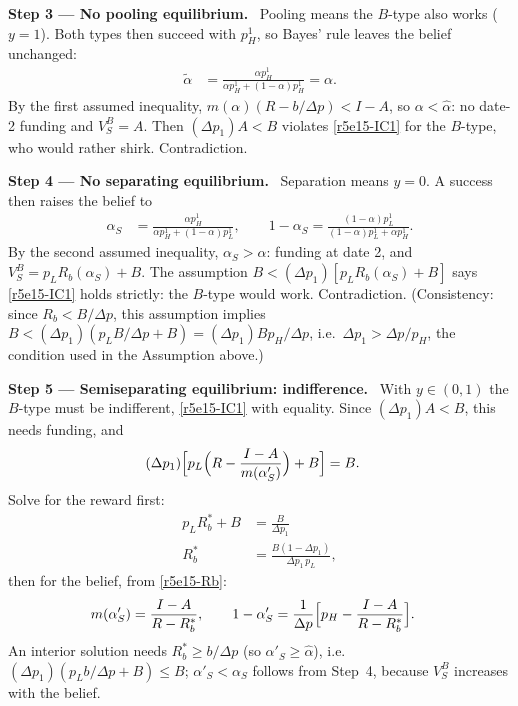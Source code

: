\documentclass[11pt,a4paper]{article}
\newcommand{\step}[2]{\par\medskip\noindent\textbf{Step #1 --- #2.}~}
\begin{document}
\step{3}{No pooling equilibrium} Pooling means the $B$-type also works ($y=1$). Both types then succeed with $p^1_H$, so Bayes' rule leaves the belief unchanged:
\begin{align}
  \tilde\alpha &= \frac{\alpha p^1_H}{\alpha p^1_H+(1-\alpha)p^1_H} = \alpha. \nonumber
\end{align}
By the first assumed inequality, $m(\alpha)(R-b/\Delta p)<I-A$, so $\alpha<\hat\alpha$: no date-2 funding and $V^B_S=A$. Then $(\Delta p_1)A<B$ violates \eqref{r5e15-IC1} for the $B$-type, who would rather shirk. Contradiction.

\step{4}{No separating equilibrium} Separation means $y=0$. A success then raises the belief to
\begin{align}
  \alpha_S &= \frac{\alpha p^1_H}{\alpha p^1_H+(1-\alpha)p^1_L}, \qquad 1-\alpha_S = \frac{(1-\alpha)p^1_L}{(1-\alpha)p^1_L+\alpha p^1_H}. \nonumber
\end{align}
By the second assumed inequality, $\alpha_S>\hat\alpha$: funding at date 2, and $V^B_S=p_LR_b(\alpha_S)+B$. The assumption $B<(\Delta p_1)[p_LR_b(\alpha_S)+B]$ says \eqref{r5e15-IC1} holds strictly: the $B$-type would work. Contradiction. (Consistency: since $R_b<B/\Delta p$, this assumption implies $B<(\Delta p_1)(p_LB/\Delta p+B)=(\Delta p_1)Bp_H/\Delta p$, i.e.\ $\Delta p_1>\Delta p/p_H$, the condition used in the Assumption above.)

\step{5}{Semiseparating equilibrium: indifference} With $y\in(0,1)$ the $B$-type must be indifferent, \eqref{r5e15-IC1} with equality. Since $(\Delta p_1)A<B$, this needs funding, and
\begin{align}
  (\Delta p_1)\Bigl[p_L\Bigl(R-\frac{I-A}{m(\alpha'_S)}\Bigr)+B\Bigr] &= B. \label{r5e15-ind}
\end{align}
Solve for the reward first:
\begin{align}
  p_LR_b^* + B &= \frac{B}{\Delta p_1} \nonumber\\
  R_b^* &= \frac{B(1-\Delta p_1)}{\Delta p_1\,p_L}, \label{r5e15-Rbs}
\end{align}
then for the belief, from \eqref{r5e15-Rb}:
\begin{align}
  m(\alpha'_S) &= \frac{I-A}{R-R_b^*}, \qquad 1-\alpha'_S = \frac{1}{\Delta p}\Bigl[p_H - \frac{I-A}{R-R_b^*}\Bigr]. \label{r5e15-alpha}
\end{align}
An interior solution needs $R_b^*\ge b/\Delta p$ (so $\alpha'_S\ge\hat\alpha$), i.e.\ $(\Delta p_1)(p_Lb/\Delta p+B)\le B$; $\alpha'_S<\alpha_S$ follows from Step~4, because $V^B_S$ increases with the belief.
\end{document}
